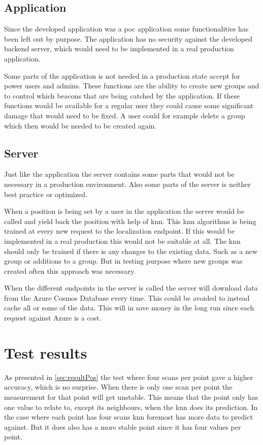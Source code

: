 \subsection{Application}\label{sec:}
Since the developed application was a \acrshort{poc} application some functionalities has been left out by purpose.
The application has no security against the developed backend server, which would need to be implemented in a real production application.

\bigskip

Some parts of the application is not needed in a production state accept for power users and admins.
These functions are the ability to create new groups and to control which beacons that are being catched by the application.
If these functions would be available for a regular user they could cause some significant damage that would need to be fixed.
A user could for example delete a group which then would be needed to be created again.

\subsection{Server}\label{sec:}
Just like the application the server contains some parts that would not be necessary in a production environment.
Also some parts of the server is neither best practice or optimized.

\bigskip

When a position is being set by a user in the application the server would be called and yield back the position with help of \acrlong{knn}.
This \acrshort{knn} algorithms is being trained at every new request to the localization endpoint.
If this would be implemented in a real production this would not be suitable at all.
The \acrshort{knn} should only be trained if there is any changes to the existing data.
Such as a new group or additions to a group.
But in testing purpose where new groups was created often this approach was necessary.

\bigskip

When the different endpoints in the server is called the server will download data from the Azure Cosmos Database every time. 
This could be avoided to instead cache all or some of the data.
This will in save money in the long run since each request against Azure is a cost.


\section{Test results}\label{sec:discussionResult}
As presented in \cref{sec:resultPos} the test where four scans per point gave a higher accuracy, which is no surprise.
When there is only one scan per point the measurement for that point will get unstable. 
This means that the point only has one value to relate to, except its neighbours, when the \acrshort{knn} does its prediction.
In the case where each point has four scans \acrshort{knn} foremost has more data to predict against.
But it does also has a more stable point since it has four values per point.


